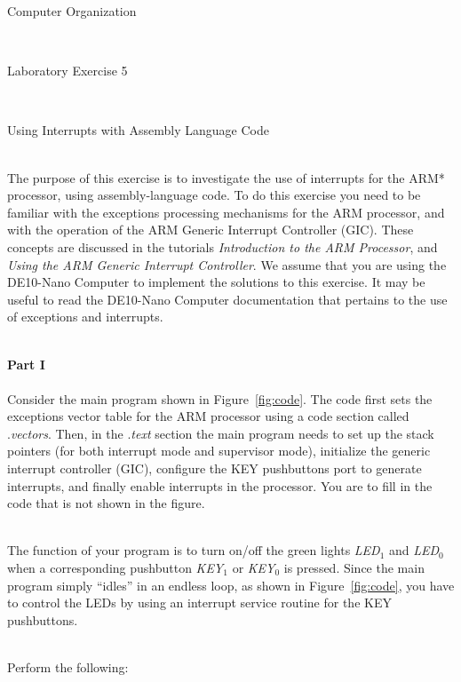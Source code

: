 \documentclass[epsfig,10pt,fullpage]{article}
\newcommand{\LabNum}{5}
\begin{document}
\centerline{\huge Computer Organization}
~\\
\centerline{\huge Laboratory Exercise \LabNum}
~\\
\centerline{\large Using Interrupts with Assembly Language Code}
~\\

\noindent
The purpose of this exercise is to investigate the use of interrupts for the ARM*
processor, using assembly-language code. To do this exercise you need to be familiar with
the exceptions processing mechanisms for the ARM processor, and with the operation of
the ARM Generic Interrupt Controller (GIC). These concepts are discussed in the tutorials 
{\it Introduction to the ARM Processor}, and {\it Using the ARM Generic Interrupt
Controller}. We assume that you are using the DE10-Nano Computer to implement the
solutions to this exercise. It may be useful to read the DE10-Nano Computer documentation that
pertains to the use of exceptions and interrupts.

~\\
\noindent
{\bf Part I}
~\\
~\\
\noindent
Consider the main program shown in Figure~\ref{fig:code}. The code first sets the
exceptions vector table for the ARM processor using a code section called .{\it vectors}.
Then, in the .{\it text} section the main program needs to set up the stack pointers (for both 
interrupt mode and supervisor mode), initialize the generic interrupt controller (GIC), 
configure the KEY pushbuttons port to generate interrupts, and finally enable interrupts 
in the processor.  You are to fill in the code that is not shown in the figure.  

~\\
\noindent
The function of your program is to turn on/off the green lights {\it LED}$_1$ and {\it LED}$_0$
when a corresponding pushbutton {\it KEY}$_1$ or {\it KEY}$_0$ is pressed. 
Since the main program simply ``idles'' in an endless loop, as
shown in Figure~\ref{fig:code}, you have to control the LEDs by using an 
interrupt service routine for the KEY pushbuttons.

~\\
\noindent
Perform the following:
\end{document}
